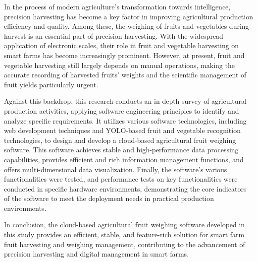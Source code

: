 In the process of modern agriculture’s transformation towards intelligence, precision harvesting has become a key factor in improving agricultural production efficiency and quality. Among these, the weighing of fruits and vegetables during harvest is an essential part of precision harvesting. With the widespread application of electronic scales, their role in fruit and vegetable harvesting on smart farms has become increasingly prominent. However, at present, fruit and vegetable harvesting still largely depends on manual operations, making the accurate recording of harvested fruits’ weights and the scientific management of fruit yields particularly urgent.

Against this backdrop, this research conducts an in-depth survey of agricultural production activities, applying software engineering principles to identify and analyze specific requirements. It utilizes various software technologies, including web development techniques and YOLO-based fruit and vegetable recognition technologies, to design and develop a cloud-based agricultural fruit weighing software. This software achieves stable and high-performance data processing capabilities, provides efficient and rich information management functions, and offers multi-dimensional data visualization. Finally, the software’s various functionalities were tested, and performance tests on key functionalities were conducted in specific hardware environments, demonstrating the core indicators of the software to meet the deployment needs in practical production environments.

In conclusion, the cloud-based agricultural fruit weighing software developed in this study provides an efficient, stable, and feature-rich solution for smart farm fruit harvesting and weighing management, contributing to the advancement of precision harvesting and digital management in smart farms.